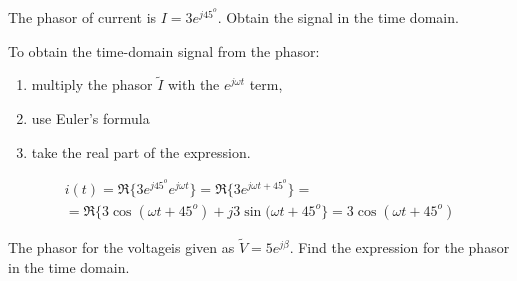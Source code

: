 \documentclass{ximera}
\begin{document}
\begin{example}
The phasor of current is  $I=3 e^{j 45^o}$. Obtain the signal in the time domain.


\begin{explanation}
  To obtain the time-domain signal from the phasor:
\begin{enumerate}
\item multiply the phasor $\tilde{I}$ with the $ e^{j\omega t}$ term, 
\item use Euler's formula 
\item take the real part of the expression.
\end{enumerate}  
   


\begin{eqnarray}
i(t) = \Re\{ 3 e^{ j 45^o}  e^{j\omega t} \} =  \Re\{3  e^{j \omega t + 45^o}  \} = \nonumber \\ = \Re \{ 3 \cos (\omega t + 45^o ) + j 3 \sin (\omega t + 45^o \} = 3  \cos (\omega t + 45^o ) \label{phtotd}
\end{eqnarray}


\end{explanation}


\end{example}


\begin{question}
The phasor for the  voltageis given as $\tilde{V}= 5 e^{ j \beta } $. Find the expression for the phasor in the time domain.
\begin{multipleChoice}  
\end{multipleChoice} 
\end{question}
\end{document}
